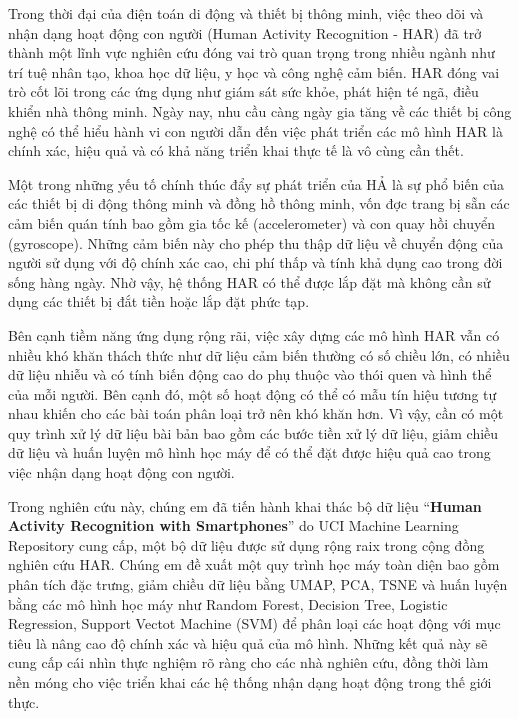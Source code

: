 \documentclass[
]{article}
\begin{document}
Trong thời đại của điện toán di động và thiết bị thông minh, việc theo
dõi và nhận dạng hoạt động con người (Human Activity Recognition - HAR)
đã trở thành một lĩnh vực nghiên cứu đóng vai trò quan trọng trong nhiều
ngành như trí tuệ nhân tạo, khoa học dữ liệu, y học và công nghệ cảm
biến. HAR đóng vai trò cốt lõi trong các ứng dụng như giám sát sức khỏe,
phát hiện té ngã, điều khiển nhà thông minh. Ngày nay, nhu cầu càng ngày
gia tăng về các thiết bị công nghệ có thể hiểu hành vi con người dẫn đến
việc phát triển các mô hình HAR là chính xác, hiệu quả và có khả năng
triển khai thực tế là vô cùng cần thết.

Một trong những yếu tố chính thúc đẩy sự phát triển của HẢ là sự phổ
biến của các thiết bị di động thông minh và đồng hồ thông minh, vốn đợc
trang bị sẵn các cảm biến quán tính bao gồm gia tốc kế (accelerometer)
và con quay hồi chuyển (gyroscope). Những cảm biến này cho phép thu thập
dữ liệu về chuyển động của người sử dụng với độ chính xác cao, chi phí
thấp và tính khả dụng cao trong đời sống hàng ngày. Nhờ vậy, hệ thống
HAR có thể được lắp đặt mà không cần sử dụng các thiết bị đắt tiền hoặc
lắp đặt phức tạp.

Bên cạnh tiềm năng ứng dụng rộng rãi, việc xây dựng các mô hình HAR vẫn
có nhiều khó khăn thách thức như dữ liệu cảm biến thường có số chiều
lớn, có nhiều dữ liệu nhiễu và có tính biến động cao do phụ thuộc vào
thói quen và hình thể của mỗi người. Bên cạnh đó, một số hoạt động có
thể có mẫu tín hiệu tương tự nhau khiến cho các bài toán phân loại trở
nên khó khăn hơn. Vì vậy, cần có một quy trình xử lý dữ liệu bài bản bao
gồm các bước tiền xử lý dữ liệu, giảm chiều dữ liệu và huấn luyện mô
hình học máy để có thể đặt được hiệu quả cao trong việc nhận dạng hoạt
động con người.

Trong nghiên cứu này, chúng em đã tiến hành khai thác bộ dữ liệu
``\textbf{Human Activity Recognition with Smartphones}'' do UCI Machine
Learning Repository cung cấp, một bộ dữ liệu được sử dụng rộng raix
trong cộng đồng nghiên cứu HAR. Chúng em đề xuất một quy trình học máy
toàn diện bao gồm phân tích đặc trưng, giảm chiều dữ liệu bằng UMAP,
PCA, TSNE và huấn luyện bằng các mô hình học máy như Random Forest,
Decision Tree, Logistic Regression, Support Vectot Machine (SVM) để phân
loại các hoạt động với mục tiêu là nâng cao độ chính xác và hiệu quả của
mô hình. Những kết quả này sẽ cung cấp cái nhìn thực nghiệm rõ ràng cho
các nhà nghiên cứu, đồng thời làm nền móng cho việc triển khai các hệ
thống nhận dạng hoạt động trong thế giới thực.
\end{document}

